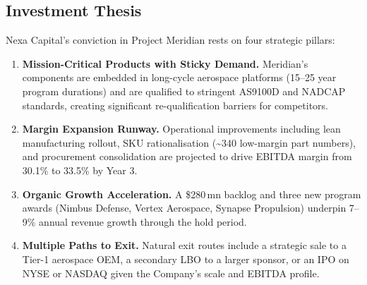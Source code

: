 \vspace{6pt}

\subsection{Investment Thesis}

Nexa Capital's conviction in Project Meridian rests on four strategic pillars:

\begin{enumerate}
  \item \textbf{Mission-Critical Products with Sticky Demand.}
    Meridian's components are embedded in long-cycle aerospace platforms (15–25 year program
    durations) and are qualified to stringent AS9100D and NADCAP standards, creating significant
    re-qualification barriers for competitors.

  \item \textbf{Margin Expansion Runway.}
    Operational improvements including lean manufacturing rollout, SKU rationalisation
    (\textasciitilde 340 low-margin part numbers), and procurement consolidation are projected
    to drive EBITDA margin from 30.1\% to 33.5\% by Year 3.

  \item \textbf{Organic Growth Acceleration.}
    A \$280\,mn backlog and three new program awards (Nimbus Defense, Vertex Aerospace, Synapse
    Propulsion) underpin 7--9\% annual revenue growth through the hold period.

  \item \textbf{Multiple Paths to Exit.}
    Natural exit routes include a strategic sale to a Tier-1 aerospace OEM, a secondary LBO to
    a larger sponsor, or an IPO on NYSE or NASDAQ given the Company's scale and EBITDA profile.
\end{enumerate}
